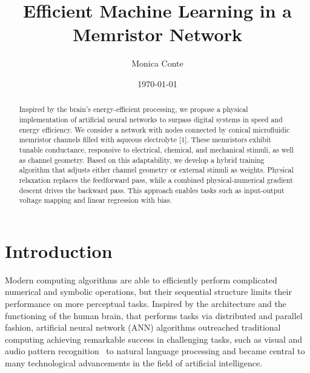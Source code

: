 \documentclass[reprint,superscriptaddress,prb,showkeys]{revtex4-2}
\begin{document}
\title{Efficient Machine Learning in a Memristor Network}

\author{Monica Conte}

\date{\today}

\begin{abstract}
Inspired by the brain's energy-efficient processing, we propose a physical implementation of artificial neural networks to surpass digital systems in speed and energy efficiency. We consider a network with nodes connected by conical microfluidic memristor channels filled with aqueous electrolyte [1]. These memristors exhibit tunable conductance, responsive to electrical, chemical, and mechanical stimuli, as well as channel geometry. Based on this adaptability, we develop a hybrid training algorithm that adjusts either channel geometry or external stimuli as weights. Physical relaxation replaces the feedforward pass, while a combined physical-numerical gradient descent drives the backward pass. This approach enables tasks such as input-output voltage mapping and linear regression with bias.
\end{abstract}
\maketitle

\renewcommand{\figurename}{FIG.}

\section{\label{sec:Intro}Introduction}


Modern computing algorithms are able to efficiently perform complicated numerical and symbolic operations, but their sequential structure limits their performance on more perceptual tasks. Inspired by the architecture and the functioning of the human brain, that performs tasks via distributed and parallel fashion, artificial neural network (ANN) algorithms outreached traditional computing achieving remarkable success in challenging tasks, such as visual and audio pattern recognition~\cite{pattern_recognition,review_image_rec, speech_rec} to natural language processing and became central to many technological advancements in the field of artificial intelligence\cite{ai_tech1}.
\end{document}
